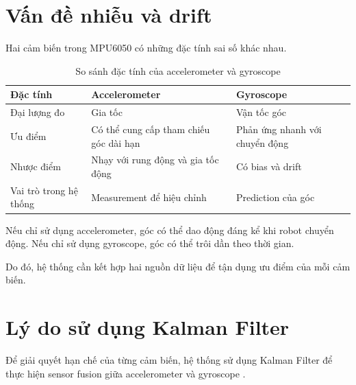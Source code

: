 \section{Vấn đề nhiễu và drift}
\label{sec:noise-drift}

Hai cảm biến trong MPU6050 có những đặc tính sai số khác nhau.

\begin{table}[H]
    \centering
    \renewcommand{\arraystretch}{1.3}
    \label{tab:sensor-comparison}
    \begin{tabular}{p{4cm} p{5cm} p{5cm}}
        \toprule
        \textbf{Đặc tính}
        & \textbf{Accelerometer}
        & \textbf{Gyroscope} \\
        \midrule
        Đại lượng đo
        & Gia tốc
        & Vận tốc góc \\

        Ưu điểm
        & Có thể cung cấp tham chiếu góc dài hạn
        & Phản ứng nhanh với chuyển động \\

        Nhược điểm
        & Nhạy với rung động và gia tốc động
        & Có bias và drift \\

        Vai trò trong hệ thống
        & Measurement để hiệu chỉnh
        & Prediction của góc \\
        \bottomrule
    \end{tabular}
    \caption{So sánh đặc tính của accelerometer và gyroscope}
\end{table}

Nếu chỉ sử dụng accelerometer, góc có thể dao động đáng kể khi robot chuyển động. Nếu chỉ sử dụng gyroscope, góc có thể trôi dần theo thời gian.

Do đó, hệ thống cần kết hợp hai nguồn dữ liệu để tận dụng ưu điểm của mỗi cảm biến.



\section{Lý do sử dụng Kalman Filter}
\label{sec:why-kalman}

Để giải quyết hạn chế của từng cảm biến, hệ thống sử dụng Kalman Filter \cite{welch-kalman} để thực hiện sensor fusion giữa accelerometer và gyroscope \cite{kalmanfilter-vn}.

